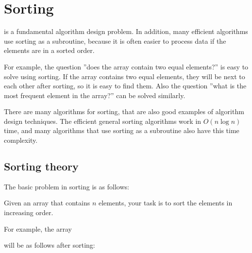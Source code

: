 \chapter{Sorting}


is a fundamental algorithm design problem.
In addition,
many efficient algorithms
use sorting as a subroutine,
because it is often easier to process
data if the elements are in a sorted order.

For example, the question ''does the array contain
two equal elements?'' is easy to solve using sorting.
If the array contains two equal elements,
they will be next to each other after sorting,
so it is easy to find them.
Also the question ''what is the most frequent element
in the array?'' can be solved similarly.

There are many algorithms for sorting, that are
also good examples of algorithm design techniques.
The efficient general sorting algorithms
work in $O(n \log n)$ time,
and many algorithms that use sorting
as a subroutine also
have this time complexity.

\section{Sorting theory}

The basic problem in sorting is as follows:
\begin{framed}
\noindent
Given an array that contains $n$ elements,
your task is to sort the elements
in increasing order.
\end{framed}
\noindent
For example, the array
\begin{center}
\end{center}
will be as follows after sorting:
\begin{center}
\end{center}

